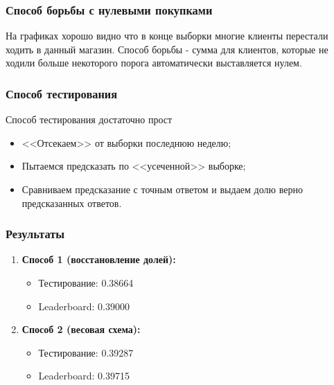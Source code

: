 \documentclass[serif,utf8]{beamer}
\begin{document}
\begin{frame}
\frametitle{Способ борьбы с нулевыми покупками}
На графиках хорошо видно что в конце выборки многие клиенты перестали ходить 
в данный магазин. Способ борьбы - сумма для клиентов, которые не ходили 
больше некоторого порога автоматически выставляется нулем.

\end{frame}

\begin{frame}
\frametitle{Способ тестирования}
Способ тестирования достаточно прост
\begin{itemize}
\item <<Отсекаем>> от выборки последнюю неделю;
\item Пытаемся предсказать по <<усеченной>> выборке;
\item Сравниваем предсказание с точным ответом и выдаем долю верно предсказанных ответов. 
\end{itemize}
\end{frame}

\begin{frame}
\frametitle{Результаты}
\begin{enumerate}
\item \textbf{Способ 1 (восстановление долей):}
	\begin{itemize}
	\item Тестирование: 0.38664
	\item Leaderboard: 0.39000
	\end{itemize}
\item \textbf{Способ 2 (весовая схема):}
	\begin{itemize}
	\item Тестирование: 0.39287
	\item Leaderboard: 0.39715
	\end{itemize}
\end{enumerate}
\end{frame}


\end{document}
